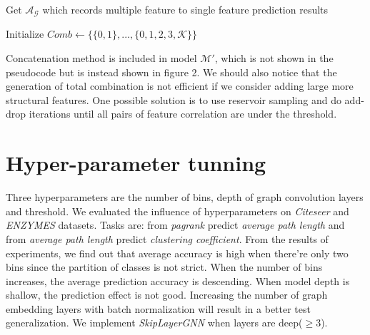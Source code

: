 \documentclass[runningheads]{llncs}
\begin{document}
\begin{algorithm}[!htp]
  \caption{Get $\mathcal A_{\mathcal G}$ which records multiple feature to 
single 
feature prediction results}
  Initialize $Comb \gets \{\{0,1\},...,\{0,1,2,3,\mathcal 
K\}\}$ \\

  \end{algorithm}
  
\vspace{-0.8cm}
Concatenation method is included in model $\mathcal M'$, which is not shown in the pseudocode but is instead shown in figure 2. We should also notice that the generation of total combination is not efficient if we consider adding large more structural features. One possible solution is to use reservoir sampling and do add-drop iterations until all pairs of feature correlation are under the threshold.

  \section{Hyper-parameter tunning}
  \vspace{-0.3cm}
  Three hyperparameters are the number of bins, depth of graph convolution layers and threshold. We evaluated the influence of hyperparameters on \textit{Citeseer} and \textit{ENZYMES} datasets. Tasks are: from \textit{pagrank} predict \textit{average path length} and from \textit{average path length} predict \textit{clustering coefficient}. From the results of experiments, we find out that average accuracy is high when there're only two bins since the partition of classes is not strict. When the number of bins increases, the average prediction accuracy is descending. When model depth is shallow, the prediction effect is not good. Increasing the number of graph embedding layers with batch normalization will result in a better test generalization. We implement \textit{SkipLayerGNN} \cite{li2019deepgcns} when layers are deep($\geq$3). 
\end{document}
